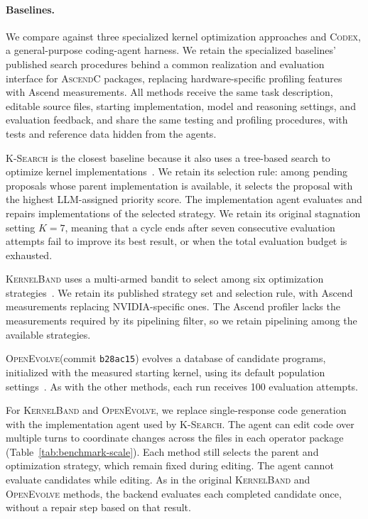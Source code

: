 \documentclass[acmsmall,screen,review,anonymous,nonacm]{acmart}
\newcommand{\ksearch}{\textsc{K-Search}\xspace}
\newcommand{\kernelband}{\textsc{KernelBand}\xspace}
\newcommand{\openevolve}{\textsc{OpenEvolve}\xspace}
\newcommand{\standardcodex}{\textsc{Codex}\xspace}
\newcommand{\ascendc}{\textsc{AscendC}\xspace}
\newcommand{\numprofiles}{100\xspace}
\begin{document}
\paragraph*{Baselines.}
We compare against three specialized kernel optimization approaches and \standardcodex, a
general-purpose coding-agent harness. We retain the specialized baselines' published
search procedures behind a common realization and evaluation interface for \ascendc packages,
replacing hardware-specific profiling features with Ascend measurements. All methods receive
the same task description, editable source files, starting implementation, model and reasoning
settings, and evaluation feedback, and share the same testing and profiling procedures, with
tests and reference data hidden from the agents.

\ksearch is the closest baseline because it also uses a tree-based search
to optimize kernel implementations~\citep{Cao2026K}. We retain its selection rule: among pending proposals whose parent
implementation is available, it selects the proposal with the highest LLM-assigned priority score.
The implementation agent evaluates and repairs implementations of the selected strategy.
We retain its original stagnation setting $K=7$, meaning that a cycle ends after seven consecutive
evaluation attempts fail to improve its best result, or when the total evaluation budget is exhausted.

\kernelband uses a multi-armed bandit to select among six optimization strategies~\citep{Ran2025KernelBand}.
We retain its published strategy set and selection rule, with Ascend measurements replacing
NVIDIA-specific ones. The Ascend profiler lacks the measurements required by its pipelining filter,
so we retain pipelining among the available strategies.

\openevolve (commit \texttt{b28ac15}) evolves a database of candidate programs, initialized with the
measured starting kernel, using its default population settings~\citep{Sharma2025OpenEvolve}.
As with the other methods, each run receives \numprofiles evaluation attempts.

For \kernelband and \openevolve, we replace single-response code generation with the implementation
agent used by \ksearch. The agent can edit code over multiple turns to coordinate changes across the
files in each operator package (Table~\ref{tab:benchmark-scale}). Each method still selects the parent
and optimization strategy, which remain fixed during editing. The agent cannot evaluate candidates
while editing. As in the original \kernelband and \openevolve methods, the backend evaluates each
completed candidate once, without a repair step based on that result.
\end{document}
